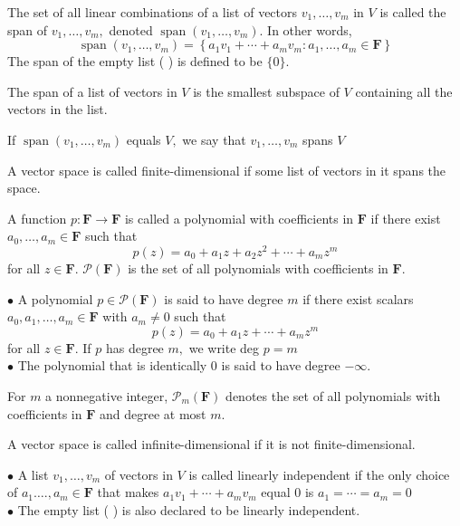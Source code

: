 
The set of all linear combinations of a list of vectors $v_{1}, \ldots, v_{m}$ in $V$ is called the span of $v_{1}, \ldots, v_{m},$ denoted $\operatorname{span}\left(v_{1}, \ldots, v_{m}\right) .$ In other words,
$$
\operatorname{span}\left(v_{1}, \ldots, v_{m}\right)=\left\{a_{1} v_{1}+\cdots+a_{m} v_{m}: a_{1}, \ldots, a_{m} \in \mathbf{F}\right\}
$$
The span of the empty list ( ) is defined to be $\{0\} .$

The span of a list of vectors in $V$ is the smallest subspace of $V$ containing all the vectors in the list.

If $\operatorname{span}\left(v_{1}, \ldots, v_{m}\right)$ equals $V,$ we say that $v_{1}, \ldots, v_{m}$ spans $V$

A vector space is called finite-dimensional if some list of vectors in it spans the space.

A function $p: \mathbf{F} \rightarrow \mathbf{F}$ is called a polynomial with coefficients in $\mathbf{F}$ if there exist $a_{0}, \ldots, a_{m} \in \mathbf{F}$ such that
$$
p(z)=a_{0}+a_{1} z+a_{2} z^{2}+\cdots+a_{m} z^{m}
$$
for all $z \in \mathbf{F}$. 
$\mathcal{P}(\mathbf{F})$ is the set of all polynomials with coefficients in $\mathbf{F}$.

$\bullet$ A polynomial $p \in \mathcal{P}(\mathbf{F})$ is said to have degree $m$ if there exist scalars $a_{0}, a_{1}, \ldots, a_{m} \in \mathbf{F}$ with $a_{m} \neq 0$ such that
$$
p(z)=a_{0}+a_{1} z+\cdots+a_{m} z^{m}
$$
for all $z \in \mathbf{F} .$ If $p$ has degree $m,$ we write deg $p=m$ \\
$\bullet$ The polynomial that is identically 0 is said to have degree $-\infty$.

For $m$ a nonnegative integer, $\mathcal{P}_{m}(\mathbf{F})$ denotes the set of all polynomials with coefficients in $\mathbf{F}$ and degree at most $m .$

A vector space is called infinite-dimensional if it is not finite-dimensional.

$\bullet$ A list $v_{1}, \ldots, v_{m}$ of vectors in $V$ is called linearly independent if the only choice of $a_{1} \ldots ., a_{m} \in \mathbf{F}$ that makes $a_{1} v_{1}+\cdots+a_{m} v_{m}$
equal 0 is $a_{1}=\cdots=a_{m}=0$ \\
$\bullet$ The empty list ( ) is also declared to be linearly independent.

